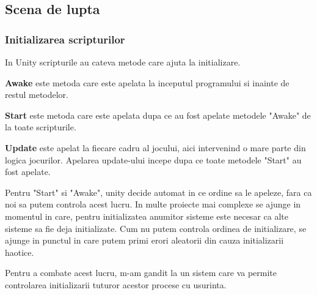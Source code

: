 \documentclass[12pt, a4paper]{article}
\begin{document}
	\subsection{Scena de lupta}
	
	\subsubsection{Initializarea scripturilor}
	\label{section: initialization}
	
	In Unity scripturile au cateva metode care ajuta la initializare.
	\newline
	
	\textbf{Awake} este metoda care este apelata la inceputul programului si inainte de restul metodelor.
	\newline
	
	\textbf{Start} este metoda care este apelata dupa ce au fost apelate metodele "Awake" de la toate scripturile.
	\newline
	
	\textbf{Update} este apelat la fiecare cadru al jocului, aici intervenind o mare parte din logica jocurilor. Apelarea update-ului incepe dupa ce toate metodele "Start" au fost apelate.
	\newline
	
	Pentru "Start" si "Awake", unity decide automat in ce ordine sa le apeleze, fara ca noi sa putem controla acest lucru. In multe proiecte mai complexe se ajunge in momentul in care, pentru initializatea anumitor sisteme este necesar ca alte sisteme sa fie deja initializate. Cum nu putem controla ordinea de initializare, se ajunge in punctul in care putem primi erori aleatorii din cauza initializarii haotice.
	\newline
	
	Pentru a combate acest lucru, m-am gandit la un sistem care va permite controlarea initializarii tuturor acestor procese cu usurinta.
	
	
\end{document}
